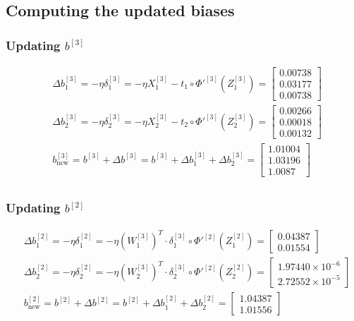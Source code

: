 \documentclass{article}
\begin{document}
\subsection*{Computing the updated biases}

\subsubsection*{Updating $b^{[3]}$}

\begin{align*}
    &\Delta b^{[3]}_1 = - \eta \delta^{[3]}_1 = - \eta X^{[3]}_1 - t_1 \circ \Phi'^{[3]}(Z^{[3]}_1) = \begin{bmatrix} 0.00738 \\  0.03177 \\  0.00738\end{bmatrix}\\
    &\Delta b^{[3]}_2 = - \eta \delta^{[3]}_2 = - \eta X^{[3]}_2 - t_2 \circ \Phi'^{[3]}(Z^{[3]}_2) = \begin{bmatrix} 0.00266 \\  0.00018 \\  0.00132\end{bmatrix} \\
    &b^{[3]}_{\text{new}} = b^{[3]} + \Delta b^{[3]} = b^{[3]} + \Delta b^{[3]}_1 + \Delta b^{[3]}_2 = \begin{bmatrix} 1.01004 \\  1.03196 \\  1.0087 \end{bmatrix} \\
\end{align*}

\subsubsection*{Updating $b^{[2]}$}

\begin{align*}
    &\Delta b^{[2]}_1 = - \eta \delta^{[2]}_1 = - \eta (W^{[3]}_1)^T \cdot \delta^{[3]}_1 \circ \Phi'^{[2]}(Z^{[2]}_1) = \begin{bmatrix} 0.04387 \\  0.01554\end{bmatrix} \\
    &\Delta b^{[2]}_2 = - \eta \delta^{[2]}_2 = - \eta (W^{[3]}_2)^T \cdot \delta^{[3]}_2 \circ \Phi'^{[2]}(Z^{[2]}_2) = \begin{bmatrix} 1.97440\times 10^{-6} \\  2.72552\times 10^{-5}\end{bmatrix} \\
    &b^{[2]}_{\text{new}} = b^{[2]} + \Delta b^{[2]} = b^{[2]} + \Delta b^{[2]}_1 + \Delta b^{[2]}_2 = \begin{bmatrix} 1.04387 \\  1.01556\end{bmatrix} \\
\end{align*}
\end{document}
